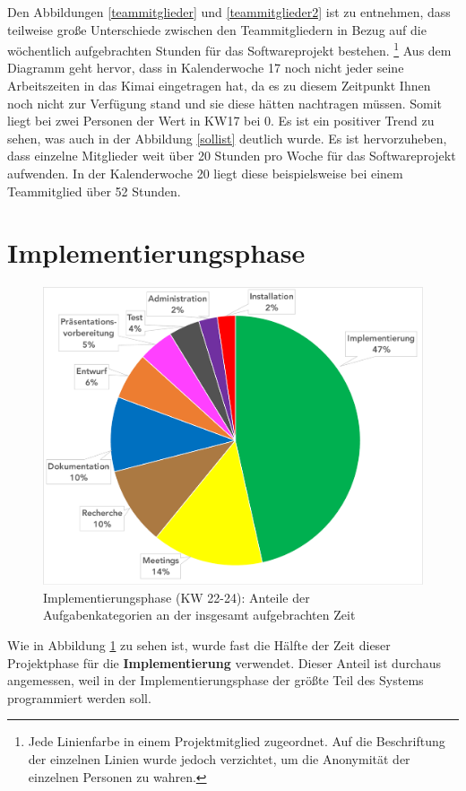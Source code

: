 \documentclass[../review_3.tex]{subfiles}
\begin{document}
Den Abbildungen \ref{teammitglieder} und \ref{teammitglieder2} ist zu entnehmen, dass teilweise große Unterschiede zwischen den Teammitgliedern in Bezug auf die wöchentlich aufgebrachten Stunden für das Softwareprojekt bestehen. \footnote{\noindent Jede Linienfarbe in einem Projektmitglied zugeordnet. Auf die Beschriftung der einzelnen Linien wurde jedoch verzichtet, um die Anonymität der einzelnen Personen zu wahren.}
Aus dem Diagramm geht hervor, dass in Kalenderwoche 17 noch nicht jeder seine Arbeitszeiten in das Kimai eingetragen hat, da es zu diesem Zeitpunkt Ihnen noch nicht zur Verfügung stand und sie diese hätten nachtragen müssen. Somit liegt bei zwei Personen der Wert in KW17 bei 0.
Es ist ein positiver Trend zu sehen, was auch in der Abbildung \ref{sollist} deutlich wurde.
Es ist hervorzuheben, dass einzelne Mitglieder weit über 20 Stunden pro Woche für das Softwareprojekt aufwenden. In der Kalenderwoche 20 liegt diese beispielsweise bei einem Teammitglied über 52 Stunden.


\section{Implementierungsphase}
\begin{figure} [h]
    \centering
    \includegraphics[width = \linewidth]{img/kimai5.pdf}
    \caption{Implementierungsphase (KW 22-24): Anteile der Aufgabenkategorien an der insgesamt aufgebrachten Zeit}
    \label{kimai5}
\end{figure}
Wie in Abbildung \ref{kimai5} zu sehen ist, wurde fast die Hälfte der Zeit dieser Projektphase für die \textbf{Implementierung} verwendet. Dieser Anteil ist durchaus angemessen, weil in der Implementierungsphase der größte Teil des Systems programmiert werden soll.
\end{document}
